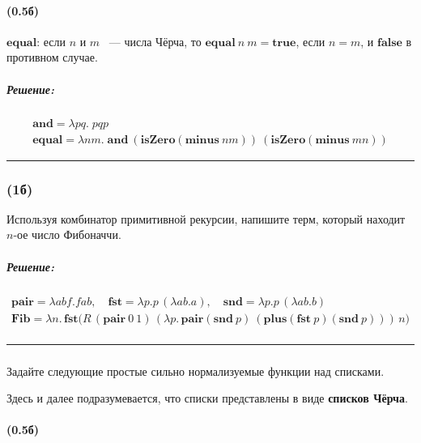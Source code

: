 \documentclass{article}
\newenvironment{proof}{\subparagraph{\hspace{-1em}Решение:\newline}}{\par\noindent\rule{\textwidth}{0.4pt}}
\newcommand{\term}[1]{\mathbf{#1}}
\begin{document}
    \paragraph{(0.5б)}

    $\term{equal}$: если $n$ и $m$ ~--- числа Чёрча, то $\term{equal}~n~m = \term{true}$, если $n = m$, и $\term{false}$ в противном случае.

    \begin{proof}
        \begin{gather*}
            \term{and} = \lambda p q.\; p q p\\
            \term{equal} = \lambda n m.\; \term{and}~(\term{isZero}(\term{minus}~n m))~(\term{isZero}(\term{minus}~m n))
        \end{gather*}
    \end{proof}

    \subsubsection{(1б)}

    Используя комбинатор примитивной рекурсии, напишите терм, который
    находит $n$-ое число Фибоначчи.

    \begin{proof}
        \begin{gather*}
            \term{pair} = \lambda a b f. f a b, \quad
            \term{fst} = \lambda p. p\,(\lambda a b. a), \quad
            \term{snd} = \lambda p. p\,(\lambda a b. b)\\
            \term{Fib} =
            \lambda n.\,
            \term{fst}\Big(
            R\,
            (\term{pair}~0~1)\,
            (\lambda p.\, \term{pair}(\term{snd}~p)~(\term{plus}(\term{fst}~p)(\term{snd}~p)))\,
            n
            \Big)\\
        \end{gather*}
    \end{proof}

    \subsubsection{}

    Задайте следующие простые сильно нормализуемые функции над списками.

    Здесь и далее подразумевается, что списки представлены в виде \textbf{списков Чёрча}.

    \paragraph{(0.5б)}
\end{document}

